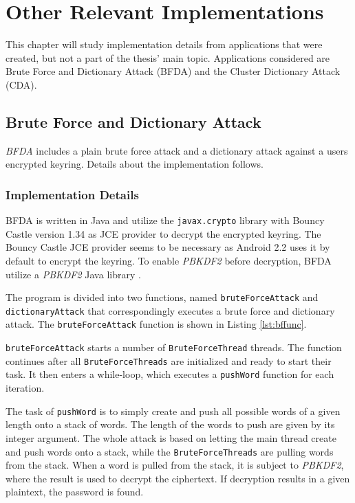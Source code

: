 \documentclass[pdftex,english,10pt,b5paper,twoside]{book}
\begin{document}
\chapter{Other Relevant Implementations}
\label{ap:other}

This chapter will study implementation details from applications that were
created, but not a part of the thesis' main topic. Applications considered are
Brute Force and Dictionary Attack (BFDA) and the Cluster Dictionary Attack (CDA).

\section{Brute Force and Dictionary Attack}

\emph{\ac{BFDA}} includes a plain brute force attack and a dictionary attack against
a users encrypted keyring. Details about the implementation follows.

\subsection{Implementation Details}

\ac{BFDA} is written in Java and utilize the \texttt{javax.crypto} library with Bouncy
Castle version 1.34 as JCE provider to decrypt the encrypted keyring. The
Bouncy Castle JCE provider seems to be necessary as Android 2.2 uses it by
default to encrypt the keyring. To enable \emph{PBKDF2} before decryption, \ac{BFDA}
utilize a \emph{PBKDF2} Java library \cite{pbkdf2}.

The program is divided into two functions, named \texttt{bruteForceAttack} and
\texttt{dictionaryAttack} that correspondingly executes a brute force and
dictionary attack. The \texttt{bruteForceAttack} function is shown in Listing
\ref{lst:bffunc}.



\texttt{bruteForceAttack} starts a number of \texttt{BruteForceThread} threads.
The function continues after all \texttt{BruteForceThreads} are initialized and
ready to start their task. It then enters a while-loop, which executes a
\texttt{pushWord} function for each iteration.

The task of \texttt{pushWord} is to simply create and push all possible words
of a given length onto a stack of words. The length of the words to push are
given by its integer argument. The whole attack is based on letting the main
thread create and push words onto a stack, while the \texttt{BruteForceThreads} are
pulling words from the stack. When a word is pulled from the stack, it is
subject to \emph{PBKDF2}, where the result is used to decrypt the ciphertext. If
decryption results in a given plaintext, the password is found.
\end{document}

